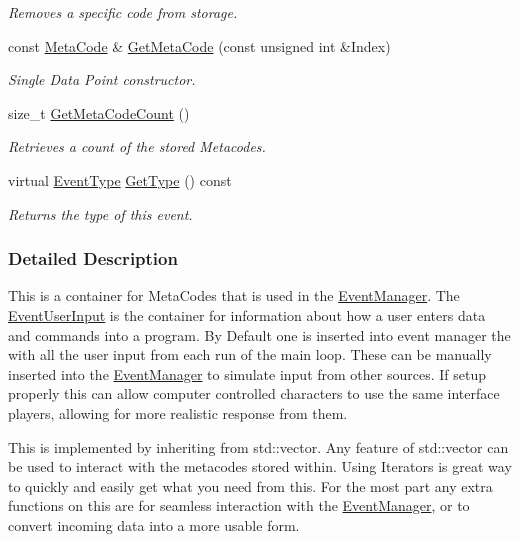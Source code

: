 \begin{DoxyCompactItemize}
\begin{DoxyCompactList}\small\item\em Removes a specific code from storage. \item\end{DoxyCompactList}\item 
const \hyperlink{classMezzanine_1_1MetaCode}{MetaCode} \& \hyperlink{classMezzanine_1_1EventUserInput_aa6f011b62624507078cbbd32a382ba42}{GetMetaCode} (const unsigned int \&Index)
\begin{DoxyCompactList}\small\item\em Single Data Point constructor. \item\end{DoxyCompactList}\item 
size\_\-t \hyperlink{classMezzanine_1_1EventUserInput_ae4eaa259b090f4b76a5aad89a7217ea5}{GetMetaCodeCount} ()
\begin{DoxyCompactList}\small\item\em Retrieves a count of the stored Metacodes. \item\end{DoxyCompactList}\item 
virtual \hyperlink{classMezzanine_1_1EventBase_ab85e31e97753b7e7ecb098f82526baef}{EventType} \hyperlink{classMezzanine_1_1EventUserInput_aeb02733446620bd7ff43b449ce5ce98a}{GetType} () const 
\begin{DoxyCompactList}\small\item\em Returns the type of this event. \item\end{DoxyCompactList}\end{DoxyCompactItemize}


\subsubsection{Detailed Description}
This is a container for MetaCodes that is used in the \hyperlink{classMezzanine_1_1EventManager}{EventManager}. The \hyperlink{classMezzanine_1_1EventUserInput}{EventUserInput} is the container for information about how a user enters data and commands into a program. By Default one is inserted into event manager the with all the user input from each run of the main loop. These can be manually inserted into the \hyperlink{classMezzanine_1_1EventManager}{EventManager} to simulate input from other sources. If setup properly this can allow computer controlled characters to use the same interface players, allowing for more realistic response from them. \par
 \par
 This is implemented by inheriting from std::vector. Any feature of std::vector can be used to interact with the metacodes stored within. Using Iterators is great way to quickly and easily get what you need from this. For the most part any extra functions on this are for seamless interaction with the \hyperlink{classMezzanine_1_1EventManager}{EventManager}, or to convert incoming data into a more usable form. 

